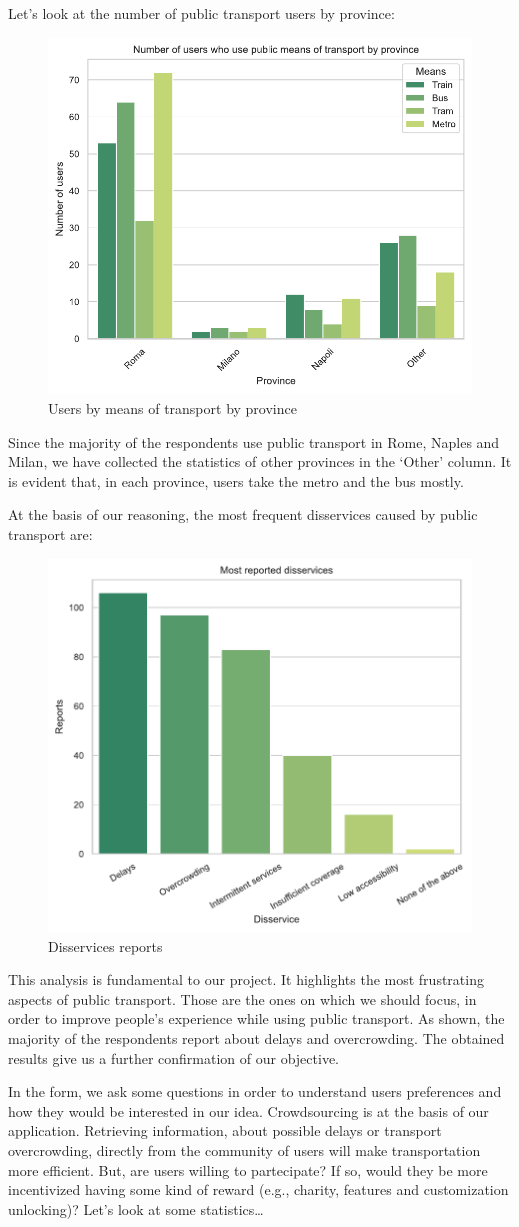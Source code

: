 \documentclass[a4paper, 11pt]{report}
\begin{document}
Let's look at the number of public transport users by province:
\begin{figure}[H]
	\centering
	\includegraphics[width=.5\textwidth]{img/analysis/users_by_means_of_transport_by_province.pdf}
	\caption{Users by means of transport by province}
\end{figure}
Since the majority of the respondents use public transport in Rome, Naples and Milan, we have collected the statistics of other provinces in the `Other' column.
It is evident that, in each province, users take the metro and the bus mostly.

At the basis of our reasoning, the most frequent disservices caused by public transport are:
\begin{figure}[H]
	\centering
	\includegraphics[width=.5\textwidth]{img/analysis/disservices_reports.pdf}
	\caption{Disservices reports}
\end{figure}
This analysis is fundamental to our project. It highlights the most frustrating aspects of public transport.
Those are the ones on which we should focus, in order to improve people's experience while using public transport.
As shown, the majority of the respondents report about delays and overcrowding. The obtained results give us a further confirmation of our objective.


In the form, we ask some questions in order to understand users preferences and how they would be interested
in our idea.
Crowdsourcing is at the basis of our application. Retrieving information, about possible delays or
transport overcrowding, directly from the community of users will make transportation more efficient.
But, are users willing to partecipate? If so, would they be more incentivized having some kind of reward (e.g., charity, features and customization unlocking)?
Let's look at some statistics\dots
\end{document}
